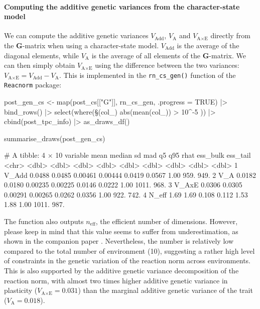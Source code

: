 \documentclass[a4paper,12pt,twoside]{article}
\begin{document}
\paragraph{Computing the additive genetic variances from the character-state model}
We can compute the additive genetic variances $V_{\text{Add}}$, $V_{\text{A}}$ and $V_{\text{A}\times\text{E}}$ directly from the $\mathbf{G}$-matrix when using a character-state model.
$V_{\text{Add}}$ is the average of the diagonal elements, while $V_{\text{A}}$ is the average of all elements of the $\mathbf{G}$-matrix.
We can then simply obtain $V_{\text{A}\times\text{E}}$ using the difference between the two variances: $V_{\text{A}\times\text{E}} = V_{\text{Add}} - V_{\text{A}}$.
This is implemented in the \texttt{rn\_cs\_gen()} function of the \texttt{Reacnorm} package:
\begin{Rinput}
post_gen_cs <-
    map(post_cs[["G"]], rn_cs_gen, .progress = TRUE) |>
    bind_rows()  |>
    select(where(\§§(col_) { abs(mean(col_)) > 10^-5 })) |>
    cbind(post_tpc_info) |>
    as_draws_df()

summarise_draws(post_gen_cs)
\end{Rinput}
\begin{Routput}
# A tibble: 4 × 10
  variable   mean median      sd     mad     q5    q95  rhat ess_bulk ess_tail
  <chr>     <dbl>  <dbl>   <dbl>   <dbl>  <dbl>  <dbl> <dbl>    <dbl>    <dbl>
1 V_Add    0.0488 0.0485 0.00461 0.00444 0.0419 0.0567  1.00     959.     949.
2 V_A      0.0182 0.0180 0.00235 0.00225 0.0146 0.0222  1.00    1011.     968.
3 V_AxE    0.0306 0.0305 0.00291 0.00265 0.0262 0.0356  1.00     922.     742.
4 N_eff    1.69   1.69   0.108   0.112   1.53   1.88    1.00    1011.     987.
\end{Routput}
The function also outputs $n_{\text{eff}}$, the efficient number of dimensions.
However, please keep in mind that this value seems to suffer from underestimation, as shown in the companion paper \autocite{devillemereuil_partitioning_2023}.
Nevertheless, the number is relatively low compared to the total number of environment (10), suggesting a rather high level of constraints in the genetic variation of the reaction norm across environments.
This is also supported by the additive genetic variance decomposition of the reaction norm, with almost two times higher additive genetic variance in plasticity ($V_{\text{A}\times\text{E}} = 0.031$) than the marginal additive genetic variance of the trait ($V_{\text{A}} = 0.018$).
\end{document}
